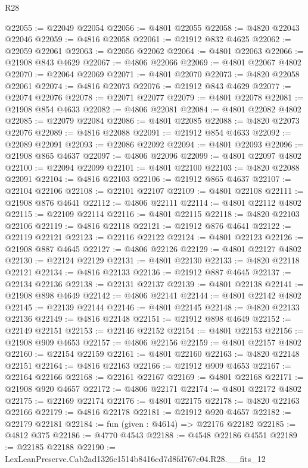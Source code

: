 \begin{lexlean}{R28}
\begin{coremodule}
@22055 := @22049 @22054
@22056 := @4801 @22055
@22058 := @4820 @22043 @22046
@22059 := @4816 @22058
@22061 := @21912 @832 @4625
@22062 := @22059 @22061
@22063 := @22056 @22062
@22064 := @4801 @22063
@22066 := @21908 @843 @4629
@22067 := @4806 @22066
@22069 := @4801 @22067 @4802
@22070 := @22064 @22069
@22071 := @4801 @22070
@22073 := @4820 @22058 @22061
@22074 := @4816 @22073
@22076 := @21912 @843 @4629
@22077 := @22074 @22076
@22078 := @22071 @22077
@22079 := @4801 @22078
@22081 := @21908 @854 @4633
@22082 := @4806 @22081
@22084 := @4801 @22082 @4802
@22085 := @22079 @22084
@22086 := @4801 @22085
@22088 := @4820 @22073 @22076
@22089 := @4816 @22088
@22091 := @21912 @854 @4633
@22092 := @22089 @22091
@22093 := @22086 @22092
@22094 := @4801 @22093
@22096 := @21908 @865 @4637
@22097 := @4806 @22096
@22099 := @4801 @22097 @4802
@22100 := @22094 @22099
@22101 := @4801 @22100
@22103 := @4820 @22088 @22091
@22104 := @4816 @22103
@22106 := @21912 @865 @4637
@22107 := @22104 @22106
@22108 := @22101 @22107
@22109 := @4801 @22108
@22111 := @21908 @876 @4641
@22112 := @4806 @22111
@22114 := @4801 @22112 @4802
@22115 := @22109 @22114
@22116 := @4801 @22115
@22118 := @4820 @22103 @22106
@22119 := @4816 @22118
@22121 := @21912 @876 @4641
@22122 := @22119 @22121
@22123 := @22116 @22122
@22124 := @4801 @22123
@22126 := @21908 @887 @4645
@22127 := @4806 @22126
@22129 := @4801 @22127 @4802
@22130 := @22124 @22129
@22131 := @4801 @22130
@22133 := @4820 @22118 @22121
@22134 := @4816 @22133
@22136 := @21912 @887 @4645
@22137 := @22134 @22136
@22138 := @22131 @22137
@22139 := @4801 @22138
@22141 := @21908 @898 @4649
@22142 := @4806 @22141
@22144 := @4801 @22142 @4802
@22145 := @22139 @22144
@22146 := @4801 @22145
@22148 := @4820 @22133 @22136
@22149 := @4816 @22148
@22151 := @21912 @898 @4649
@22152 := @22149 @22151
@22153 := @22146 @22152
@22154 := @4801 @22153
@22156 := @21908 @909 @4653
@22157 := @4806 @22156
@22159 := @4801 @22157 @4802
@22160 := @22154 @22159
@22161 := @4801 @22160
@22163 := @4820 @22148 @22151
@22164 := @4816 @22163
@22166 := @21912 @909 @4653
@22167 := @22164 @22166
@22168 := @22161 @22167
@22169 := @4801 @22168
@22171 := @21908 @920 @4657
@22172 := @4806 @22171
@22174 := @4801 @22172 @4802
@22175 := @22169 @22174
@22176 := @4801 @22175
@22178 := @4820 @22163 @22166
@22179 := @4816 @22178
@22181 := @21912 @920 @4657
@22182 := @22179 @22181
@22184 := fun (given : @4614) => @22176 @22182
@22185 := @4812 @375
@22186 := @4770 @4543
@22188 := @4548 @22186 @4551
@22189 := @22185 @22188
@22190 := LexLeanPreserve.Cab2ad1326c1514b8416cd7d8fd767c04.R28.__fits_12

\end{coremodule}
\end{lexlean}
